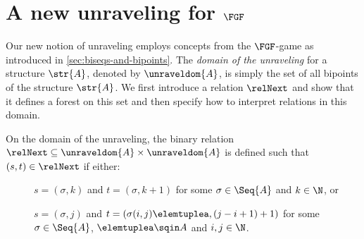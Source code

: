 \section{A new unraveling for $\FGF$}
Our new notion of unraveling employs concepts from the $\FGF$-game as introduced in \cref{sec:biseqs-and-bipoints}.
The \emph{domain of the unraveling} for a structure $\str{A}$, denoted by $\unraveldom{A}$, is simply the set of all bipoints of the structure $\str{A}$.
We first introduce a relation $\relNext$ and show that it defines a forest on this set and then specify how to interpret relations in this domain.

\begin{definition}
On the domain of the unraveling, the binary relation $\relNext \subseteq \unraveldom{A} \times \unraveldom{A}$ is defined such that $(s, t) \in \relNext$ if either:
\begin{description}
  \item[] $s = (\sigma, k)$ and $t = (\sigma, k + 1)$ for some $\sigma \in \Seq{A}$ and $k \in \N$, or
  \item[] $s = (\sigma, j)$ and $t = (\sigma(i,j)\elemtuplea, (j-i+1) + 1)$ for some $\sigma \in \Seq{A}$, $\elemtuplea \sqin A$ and $i,j \in \N$.
\end{description}
\end{definition}

